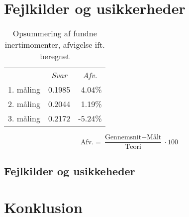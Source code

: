 \section{Fejlkilder og usikkerheder}


\begin{table}[h]
  \begin{tabular}{llr}
    &
    \multicolumn{1}{c}{\emph{Svar}} &
    \multicolumn{1}{c}{\emph{Afv.}}\\
    \cmidrule{2-3}
    1. måling & 0.1985 &  4.04\%   \\
    2. måling & 0.2044 &  1.19\%   \\
    3. måling & 0.2172 & -5.24\%   \\
  \end{tabular}
  \caption[Fundne inertimomenter]{Opsummering af fundne inertimomenter, afvigelse ift. beregnet}
\end{table}

$$\text{Afv.} =\frac{\text{Gennemsnit}-\text{Målt}}{\text{Teori}} \cdot 100$$
\subsection{Fejlkilder og usikkeheder}

\section{Konklusion}
